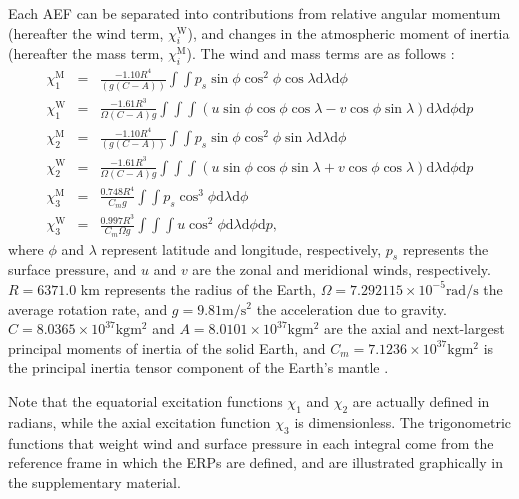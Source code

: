\documentclass[draft,jgrga]{agutex}
\begin{document}
\begin{article}
Each AEF can be separated into contributions from relative angular momentum (hereafter the wind term, $\chi_i^{\text{W}}$), and changes in the atmospheric moment of inertia (hereafter the mass term,  $\chi_i^{\text{M}}$).
The wind and mass terms are as follows \citep{barnesetal1983}:
\begin{eqnarray} 
%
\chi^{\text{M}}_1 &=&
\frac{ -1.10R^4}{(g(C-A))}
\int \int
p_s \sin \phi \cos^2 \phi \cos \lambda
\text{d}\lambda \text{d}\phi
\label{eq:X1m}
\\
\chi^{\text{W}}_1 &=&
\frac{-1.61 R^3}{\Omega (C-A)g}
\int \int \int
(u \sin \phi \cos \phi \cos \lambda -
v \cos \phi \sin \lambda)
\text{d}\lambda \text{d}\phi \text{d}p
\label{eq:X1w}
\\
\chi^{\text{M}}_2 &=&
\frac{ -1.10 R^4}{(g(C-A))}
\int \int
p_s \sin \phi \cos^2 \phi \sin \lambda
\text{d}\lambda \text{d}\phi
\label{eq:X2m}
\\
\chi^{\text{W}}_2 &=&
\frac{-1.61 R^3}{\Omega (C-A)g}
\int \int \int
(u \sin \phi \cos \phi \sin \lambda +
v \cos \phi \cos \lambda)
\text{d}\lambda \text{d}\phi \text{d}p
\label{eq:X2w}
\\
\chi^{\text{M}}_3 &=&
\frac{0.748 R^4}{C_m g}
\int \int
p_s \cos^3 \phi
\text{d}\lambda \text{d}\phi
\label{eq:X3m}
\\
\chi^{\text{W}}_3 &=&
\frac{0.997 R^3}{C_m \Omega g}
\int \int \int
u \cos^2 \phi
\text{d}\lambda \text{d}\phi \text{d}p,
\label{eq:X3w}
%
\end{eqnarray}
 {where $\phi$ and $\lambda$ represent latitude and longitude, respectively, $p_s$ represents the surface pressure, and $u$ and $v$ are the zonal and meridional winds, respectively.}
$R = 6371.0$ km represents the radius of the Earth, $\Omega = 7.292115\times 10^{-5} \text{rad}/\text{s}$ the average rotation rate, and $g = 9.81 \text{m}/\text{s}^2$  the acceleration due to gravity.
 $C = 8.0365 \times 10^{37} \text{kg} \text{m}^2$ and $A = 8.0101 \times 10^{37} \text{kg} \text{m}^2$ are the  axial and next-largest principal moments of inertia of the solid Earth, and $C_m = 7.1236 \times 10^{37} \text{kg} \text{m}^2$ is the principal inertia tensor component of the Earth's mantle \citep{gross2009}.
 
Note that the  equatorial excitation functions $\chi_1$ and $\chi_2$ are actually defined in radians, while the axial excitation function $\chi_3$ is dimensionless.
The trigonometric functions that weight wind and surface pressure in each integral come from the reference frame in which the ERPs are defined, and are illustrated graphically in the supplementary material.


\end{article}
\end{document}
